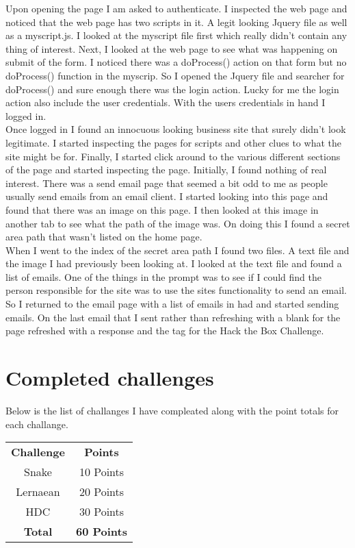 \documentclass[letterpaper, onecolumn,10pt]{IEEEtran}
\begin{document}
	        Upon opening the page I am asked to authenticate. I inspected the web page and noticed that the web page has two scripts in it. A legit looking Jquery file as well as a myscript.js. I looked at the myscript file first which really didn't contain any thing of interest. Next, I looked at the web page to see what was happening on submit of the form. I noticed there was a doProcess() action on that form but no doProcess() function in the myscrip. So I opened the Jquery file and searcher for doProcess() and sure enough there was the login action. Lucky for me the login action also include the user credentials. With the users credentials in hand I logged in.\\
	        
	        Once logged in I found an innocuous looking business site that surely didn't look legitimate. I started inspecting the pages for scripts and other clues to what the site might be for. Finally, I started click around to the various different sections of the page and started inspecting the page. Initially, I found nothing of real interest. There was a send email page that seemed a bit odd to me as people usually send emails from an email client. I started looking into this page and found that there was an image on this page. I then looked at this image in another tab to see what the path of the image was. On doing this I found a secret area path that wasn't listed on the home page.\\
	        
	        When I went to the index of the secret area path I found two files. A text file and the image I had previously been looking at. I looked at the text file and found a list of emails. One of the things in the prompt was to see if I could find the person responsible for the site was to use the sites functionality to send an email. So I returned to the email page with a list of emails in had and started sending emails. On the last email that I sent rather than refreshing with a blank for the page refreshed with a response and the tag for the Hack the Box Challenge.\\
	        
	        \section{Completed challenges}
	        Below is the list of challanges I have compleated along with the point totals for each challange.\\
	            \begin{center}
	                \begin{tabular}{ |c|c| }
	                     \textbf{Challenge} & \textbf{Points}  \\
	                     Snake & 10 Points \\
	                     Lernaean & 20 Points \\
	                     HDC & 30 Points \\
	                     \textbf{Total} & \textbf{60 Points}
	                \end{tabular}
	            \end{center}
		
		
\end{document}
